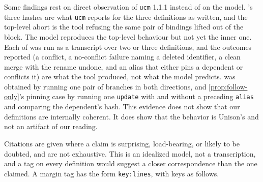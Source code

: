 \documentclass[11pt]{article}
\theoremstyle{definition}
\theoremstyle{plain}
\theoremstyle{remark}
\begin{document}
Some findings rest on direct observation of \texttt{ucm} 1.1.1 instead of on the model.
's three hashes are what \texttt{ucm} reports for the three definitions as
written, and the top-level abort is the tool refusing the same pair of bindings lifted out of the
block. The model reproduces the top-level behaviour but not yet the inner one. Each of
 was run as a transcript over two or three definitions,
and the outcomes reported (a conflict, a no-conflict failure naming a deleted identifier, a clean
merge with the rename undone, and an alias that either pins a dependent or conflicts it) are what the
tool produced, not what the model predicts.  was obtained by running one pair
of branches in both directions, and \cref{prop:follow-only}'s pinning case by running one
\texttt{update} with and without a preceding \texttt{alias} and comparing the dependent's hash. This
evidence does not show that our definitions are internally coherent. It does show that the behavior
is Unison's and not an artifact of our reading.

Citations are given where a claim is surprising, load-bearing, or likely to be doubted, and are not
exhaustive. This is an idealized model, not a transcription, and a tag on every definition would
suggest a closer correspondence than the one claimed. A margin tag has the form \texttt{key:lines},
with keys as follows.
\end{document}
